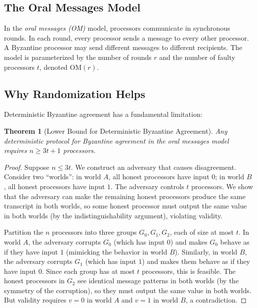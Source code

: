 \documentclass[twoside,12pt]{book}
\theoremstyle{plain}
\newtheorem{theorem}{Theorem}[chapter]
\theoremstyle{definition}
\theoremstyle{remark}
\begin{document}
\subsection{The Oral Messages Model}
\label{subsec:oral-messages}

In the \emph{oral messages (OM)} model, processors communicate in synchronous rounds. In each round, every processor sends a message to every other processor. A Byzantine processor may send different messages to different recipients. The model is parameterized by the number of rounds $r$ and the number of faulty processors $t$, denoted $\mathrm{OM}(r)$.

\subsection{Why Randomization Helps}
\label{subsec:why-random-byzantine}

Deterministic Byzantine agreement has a fundamental limitation:

\begin{theorem}[Lower Bound for Deterministic Byzantine Agreement]
\label{thm:byzantine-lower}
Any deterministic protocol for Byzantine agreement in the oral messages model requires $n \geq 3t + 1$ processors.
\end{theorem}

\begin{proof}
Suppose $n \leq 3t$. We construct an adversary that causes disagreement. Consider two ``worlds'': in world $A$, all honest processors have input $0$; in world $B$, all honest processors have input $1$. The adversary controls $t$ processors. We show that the adversary can make the remaining honest processors produce the same transcript in both worlds, so some honest processor must output the same value in both worlds (by the indistinguishability argument), violating validity.

Partition the $n$ processors into three groups $G_0, G_1, G_2$, each of size at most $t$. In world $A$, the adversary corrupts $G_0$ (which has input $0$) and makes $G_0$ behave as if they have input $1$ (mimicking the behavior in world $B$). Similarly, in world $B$, the adversary corrupts $G_1$ (which has input $1$) and makes them behave as if they have input $0$. Since each group has at most $t$ processors, this is feasible. The honest processors in $G_2$ see identical message patterns in both worlds (by the symmetry of the corruption), so they must output the same value in both worlds. But validity requires $v = 0$ in world $A$ and $v = 1$ in world $B$, a contradiction.
\end{proof}
\end{document}
